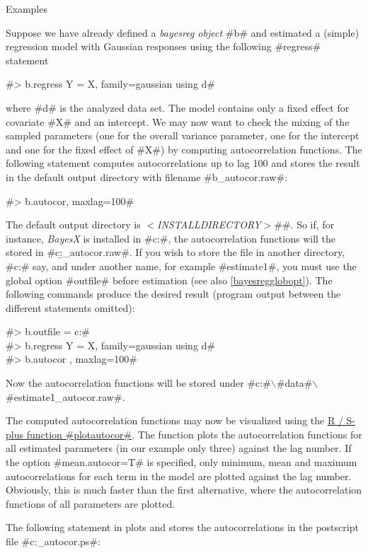 \begin{stanza}{Examples}

Suppose we have already defined a {\em bayesreg object} #b# and
estimated a (simple) regression model with Gaussian responses
using the following #regress# statement

#> b.regress Y = X, family=gaussian using d#

where #d# is the analyzed data set. The model contains only a
fixed effect for covariate #X# and an intercept. We may now want
to check the mixing of the sampled parameters (one for the overall
variance parameter, one for the intercept and one for the fixed
effect of #X#) by computing autocorrelation functions. The
following statement computes autocorrelations up to lag 100 and
stores the result in the default output directory with filename
#b_autocor.raw#:

#> b.autocor, maxlag=100#

The default output directory is
{\em$<$INSTALLDIRECTORY$>$}#\output#. So if, for instance, {\em
BayesX} is installed in #c:\bayes#, the autocorrelation functions
will the stored in #c:\bayes\output\b_autocor.raw#. If you wish to
store the file in another directory, #c:\data# say, and under
another name, for example #estimate1#, you must use the global
option #outfile# before estimation (see also
\autoref{bayesregglobopt}). The following commands produce the
desired result (program output between the different statements
omitted):

#> b.outfile = c:\data{}# \\
#> b.regress Y = X, family=gaussian using d# \\
#> b.autocor , maxlag=100#

Now the autocorrelation functions will be stored under
#c:#$\backslash$#data#$\backslash$#estimate1_autocor.raw#.

The computed autocorrelation functions may now be visualized using
the \hyperref[splusplotautocor]{R / S-plus function #plotautocor#}.
The function plots the autocorrelation functions for all estimated
parameters (in our example only three) against the lag number. If
the option #mean.autocor=T# is specified, only minimum, mean and
maximum autocorrelations for each term in the model are plotted
against the lag number. Obviously, this is much faster than the
first alternative, where the autocorrelation functions of all
parameters are plotted.

The following statement in plots and stores the autocorrelations in
the postscript file #c:\data{}_autocor.ps#:


\end{stanza}
